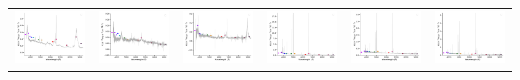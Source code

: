 \begin{center}
\begin{longtable}{l l l l l l }
    \includegraphics[width=0.3\linewidth, clip]{Figs/Figs-sdss/spec-9407-58041-0415-STRIPE82-0004-031191.pdf} & \includegraphics[width=0.3\linewidth, clip]{Figs/Figs-sdss/spec-9409-58051-0225-STRIPE82-0015-053521.pdf} & \includegraphics[width=0.3\linewidth, clip]{Figs/Figs-sdss/spec-9409-58051-0529-STRIPE82-0014-019228.pdf} & \includegraphics[width=0.3\linewidth, clip]{Figs/Figs-sdss/spec-0330-52370-0471-SPLUS-n03s21-043085.pdf} & \includegraphics[width=0.3\linewidth, clip]{Figs/Figs-sdss/spec-0331-52368-0215-SPLUS-n03s23-001039.pdf} & \includegraphics[width=0.3\linewidth, clip]{Figs/Figs-sdss/spec-0331-52368-0449-SPLUS-n02s23-034336.pdf} \\

\end{longtable}
\end{center}

